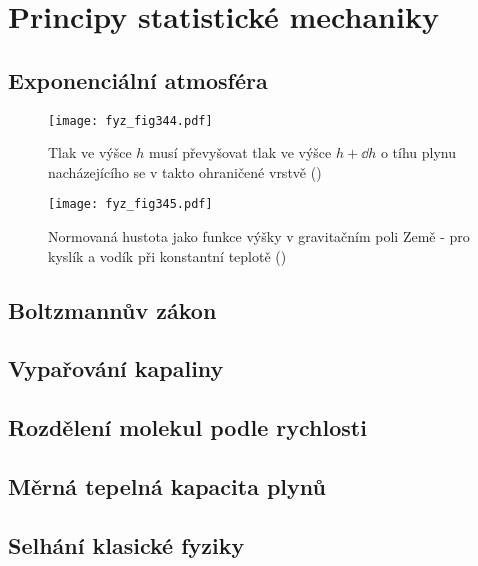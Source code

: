 \chapter{Principy statistické mechaniky}\label{fyz:IchapXL}
\minitoc
  \section{Exponenciální atmosféra}\label{fyz:IchapXLsecI}

    \begin{figure}[ht!] %
      \centering
      \texttt{[image: fyz\_fig344.pdf]}
      \caption{Tlak ve výšce \(h\) musí převyšovat tlak ve výšce \(h+\dd{h}\) o tíhu plynu 
               nacházejícího se v takto ohraničené vrstvě
               (\cite[s.~540]{Feynman01})}
      \label{fyz_fig344}
    \end{figure}

    \begin{figure}[ht!] %
      \centering
      \texttt{[image: fyz\_fig345.pdf]}
      \caption{Normovaná hustota jako funkce výšky v gravitačním poli Země - pro kyslík a vodík při 
               konstantní teplotě
               (\cite[s.~541]{Feynman01})}
      \label{fyz_fig345}
    \end{figure}
    
  \section{Boltzmannův zákon}\label{fyz:IchapXLsecII}
  \section{Vypařování kapaliny}\label{fyz:IchapXLsecIII}
  \section{Rozdělení molekul podle rychlosti}\label{fyz:IchapXLsecIV}
  \section{Měrná tepelná kapacita plynů}\label{fyz:IchapXLsecV}
  \section{Selhání klasické fyziky}\label{fyz:IchapXLsecVI}
